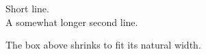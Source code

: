 \documentclass{article}
\begin{document}
\begin{center}
\begin{varwidth}{\linewidth}
Short line. \\
A somewhat longer second line.
\end{varwidth}
\end{center}
The box above shrinks to fit its natural width.
\end{document}
